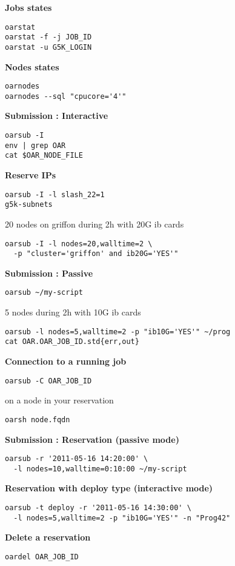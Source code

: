\textbf{Jobs states}
\begin{lstlisting}
oarstat
oarstat -f -j JOB_ID
oarstat -u G5K_LOGIN
\end{lstlisting}

\textbf{Nodes states}
\begin{lstlisting}
oarnodes
oarnodes --sql "cpucore='4'"
\end{lstlisting}
\makeruleinbox

\textbf{Submission : Interactive}
\begin{lstlisting}
oarsub -I
env | grep OAR
cat $OAR_NODE_FILE
\end{lstlisting}
\makeruleinbox

\textbf{Reserve IPs}
\begin{lstlisting}
oarsub -I -l slash_22=1
g5k-subnets
\end{lstlisting}

20 nodes on griffon during 2h with 20G ib cards
\begin{lstlisting}
oarsub -I -l nodes=20,walltime=2 \
  -p "cluster='griffon' and ib20G='YES'"
\end{lstlisting}
\makeruleinbox

\textbf{Submission : Passive}
\begin{lstlisting}
oarsub ~/my-script
\end{lstlisting}

5 nodes during 2h with 10G ib cards
\begin{lstlisting}
oarsub -l nodes=5,walltime=2 -p "ib10G='YES'" ~/prog
cat OAR.OAR_JOB_ID.std{err,out}
\end{lstlisting}
\makeruleinbox

\textbf{Connection to a running job}
\begin{lstlisting}
oarsub -C OAR_JOB_ID
\end{lstlisting}
on a node in your reservation
\begin{lstlisting}
oarsh node.fqdn
\end{lstlisting}
\makeruleinbox

\textbf{Submission : Reservation (passive mode)}
\begin{lstlisting}
oarsub -r '2011-05-16 14:20:00' \
  -l nodes=10,walltime=0:10:00 ~/my-script
\end{lstlisting}
\textbf{Reservation with deploy type (interactive mode)}
\begin{lstlisting}
oarsub -t deploy -r '2011-05-16 14:30:00' \
  -l nodes=5,walltime=2 -p "ib10G='YES'" -n "Prog42"
\end{lstlisting}
\makeruleinbox

\textbf{Delete a reservation}
\begin{lstlisting}
oardel OAR_JOB_ID
\end{lstlisting}\vspace{-1.5em}%